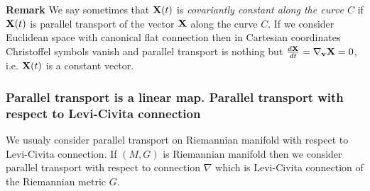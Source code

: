 \documentclass[12pt]{article}
\theoremstyle{theorem}
\numberwithin{equation}{section}
\begin{document}
{\begin {itemize}
\end{itemize}

\m

{\bf Remark}    We say sometimes that ${\bf X}(t)$ is 
{\it covariantly constant along the curve $C$}
   if ${\bf X}(t)$ is parallel transport of the 
vector ${\bf X}$ along the curve $C$.
  If we consider Euclidean space with canonical flat 
connection then in Cartesian coordinates
  Christoffel symbols vanish and parallel transport is nothing but
   ${d {\bf X}\over dt}=\nabla_{\bf v} {\bf X}=0$, i.e.
${\bf X}(t)$ is a constant vector.







\subsubsection {Parallel transport is a linear map.
Parallel transport with respect to Levi-Civita connection}
\label{paralleltransport2}






 We usualy consider parallel 
transport on Riemannian manifold with respect to Levi-Civita connection.
If $(M,G)$ is Riemannian manifold
 then we consider parallel transport with respect to 
connection $\nabla$ which is Levi-Civita connection
of the  Riemannian metric $G$.




}
\end{document}
